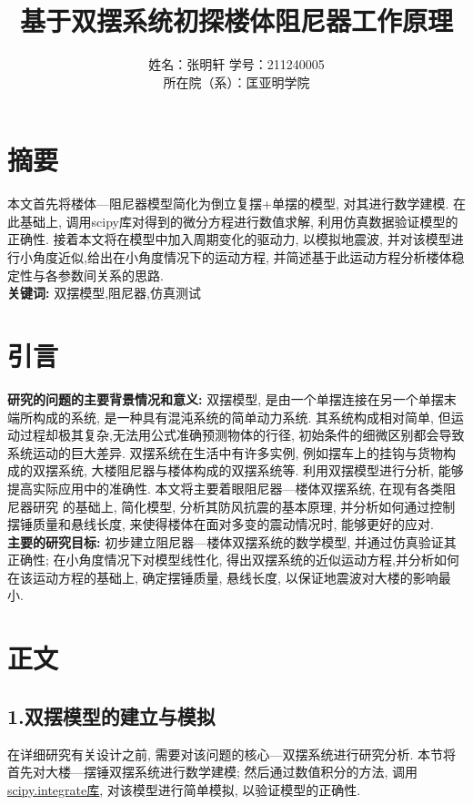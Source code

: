 \documentclass[10.5pt,a4paper]{ctexart}
\title{\textbf{\Huge{基于双摆系统初探楼体阻尼器工作原理}}}
\author{
	\Large{姓名：张明轩}\qquad 
	\Large{学号：211240005}\\[8pt]
	\Large{所在院（系）：匡亚明学院}\\[16pt]
}
\date{}
\begin{document}
\maketitle


\setlength{\oddsidemargin}{-.5cm} 
\setlength{\evensidemargin}{\oddsidemargin}
\setlength{\textwidth}{17.00cm}

\section{摘要}
\noindent 本文首先将楼体---阻尼器模型简化为倒立复摆+单摆的模型, 对其进行数学建模. 在此基础上, 调用scipy库对得到的微分方程进行数值求解, 利用仿真数据验证模型的正确性. 
接着本文将在模型中加入周期变化的驱动力, 以模拟地震波, 并对该模型进行小角度近似,给出在小角度情况下的运动方程, 并简述基于此运动方程分析楼体稳定性与各参数间关系的思路.\\
\noindent \textbf{关键词:} 双摆模型,阻尼器,仿真测试
\section{引言}

\noindent \textbf{研究的问题的主要背景情况和意义:}
双摆模型, 是由一个单摆连接在另一个单摆末端所构成的系统, 是一种具有混沌系统的简单动力系统. 其系统构成相对简单, 但运动过程却极其复杂,无法用公式准确预测物体的行径, 
初始条件的细微区别都会导致系统运动的巨大差异\cite{ref1}. 双摆系统在生活中有许多实例, 例如摆车上的挂钩与货物构成的双摆系统, 大楼阻尼器与楼体构成的双摆系统等. 利用双摆模型进行分析, 
能够提高实际应用中的准确性\cite{ref2}. 本文将主要着眼阻尼器---楼体双摆系统, 在现有各类阻尼器研究\cite{ref3} \cite{ref4}的基础上, 简化模型, 分析其防风抗震的基本原理, 并分析如何通过控制摆锤质量和悬线长度, 来使得楼体在面对多变的震动情况时, 能够更好的应对.\\
\noindent \textbf{主要的研究目标:}
初步建立阻尼器---楼体双摆系统的数学模型, 并通过仿真验证其正确性; 在小角度情况下对模型线性化, 得出双摆系统的近似运动方程,并分析如何在该运动方程的基础上, 确定摆锤质量, 悬线长度, 以保证地震波对大楼的影响最小.
\section{正文}

\subsection*{1.双摆模型的建立与模拟}
在详细研究有关设计之前, 需要对该问题的核心---双摆系统进行研究分析. 本节将首先对大楼---摆锤双摆系统进行数学建模; 
然后通过数值积分的方法, 调用\href{https://docs.scipy.org/doc/scipy/tutorial/integrate.html}{scipy.integrate库}\cite{ref5}, 对该模型进行简单模拟, 以验证模型的正确性.
\end{document}
